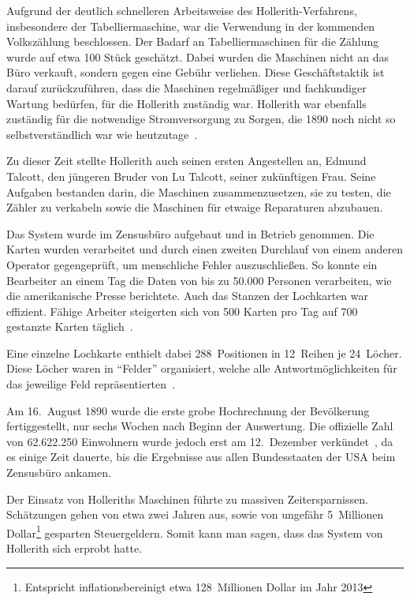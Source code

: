 \documentclass[parskip=half]{scrartcl}
\begin{document}
Aufgrund der deutlich schnelleren Arbeitsweise des Hollerith-Verfahrens,
insbesondere der Tabelliermaschine, war die Verwendung in der kommenden
Volkszählung beschlossen. Der Badarf an Tabelliermaschinen für die Zählung
wurde auf etwa 100 Stück geschätzt. Dabei wurden die Maschinen nicht an das
Büro verkauft, sondern gegen eine Gebühr verliehen. Diese Geschäftstaktik ist
darauf zurückzuführen, dass die Maschinen regelmäßiger und fachkundiger Wartung
bedürfen, für die Hollerith zuständig war. Hollerith war ebenfalls zuständig
für die notwendige Stromversorgung zu Sorgen, die 1890 noch nicht so
selbstverständlich war wie heutzutage~\cite{austrian1982herman}.

Zu dieser Zeit stellte Hollerith auch seinen ersten Angestellen an, Edmund
Talcott, den jüngeren Bruder von Lu Talcott, seiner zukünftigen Frau. Seine
Aufgaben bestanden darin, die Maschinen zusammenzusetzen, sie zu testen, die
Zähler zu verkabeln sowie die Maschinen für etwaige Reparaturen abzubauen.

Das System wurde im Zensusbüro aufgebaut und in Betrieb genommen. Die Karten
wurden verarbeitet und durch einen zweiten Durchlauf von einem anderen Operator
gegengeprüft, um menschliche Fehler auszuschließen. So konnte ein Bearbeiter
an einem Tag die Daten von bis zu 50.000 Personen verarbeiten, wie die
amerikanische Presse berichtete. Auch das Stanzen der Lochkarten war effizient.
Fähige Arbeiter steigerten sich von 500 Karten pro Tag auf 700 gestanzte Karten
täglich~\cite{austrian1982herman}.

Eine einzelne Lochkarte enthielt dabei 288~Positionen in 12~Reihen je
24~Löcher. Diese Löcher waren in \enquote{Felder} organisiert, welche alle
Antwortmöglichkeiten für das jeweilige Feld
repräsentierten~\cite{priestley2010science}.

Am 16.~August 1890 wurde die erste grobe Hochrechnung der Bevölkerung
fertiggestellt, nur sechs Wochen nach Beginn der Auswertung. Die offizielle
Zahl von 62.622.250 Einwohnern wurde jedoch erst am 12.~Dezember
verkündet~\cite{austrian1982herman}, da es einige Zeit dauerte, bis die
Ergebnisse aus allen Bundesstaaten der USA beim Zensusbüro ankamen.

Der Einsatz von Holleriths Maschinen führte zu massiven Zeitersparnissen.
Schätzungen gehen von etwa zwei Jahren aus, sowie von ungefähr 5~Millionen
Dollar\footnote{Entspricht inflationsbereinigt etwa 128~Millionen Dollar im
Jahr 2013} gesparten Steuergeldern. Somit kann man sagen, dass das System von
Hollerith sich erprobt hatte.
\end{document}
